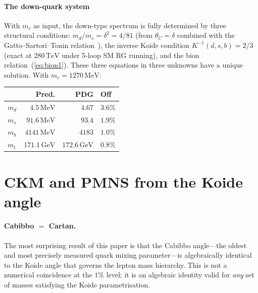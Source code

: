\documentclass[aps,prd,twocolumn,showpacs,preprintnumbers,superscriptaddress]{revtex4-2}
\newcommand{\MeV}{\,\mathrm{MeV}}
\newcommand{\GeV}{\,\mathrm{GeV}}
\newcommand{\TeV}{\,\mathrm{TeV}}
\begin{document}
\paragraph{The down-quark system}

With $m_c$ as input, the down-type spectrum is fully determined
by three structural conditions:
$m_d/m_s = \delta^2 = 4/81$ (from $\theta_C = \delta$ combined
with the Gatto--Sartori--Tonin relation~\cite{GattoSartoriTonin:1968}),
the inverse Koide condition $K^{-1}(d,s,b) = 2/3$ (exact at
$280\TeV$ under 5-loop SM RG running), and the bion
relation~(\ref{eq:bion1}).
These three equations in three unknowns have a unique solution.
With $m_c = 1270\MeV$:
\begin{center}
\begin{tabular}{lrrl}
\toprule
& Pred. & PDG & Off \\
\midrule
$m_d$ & $4.5\MeV$ & $4.67$ & $3.6\%$ \\
$m_s$ & $91.6\MeV$ & $93.4$ & $1.9\%$ \\
$m_b$ & $4141\MeV$ & $4183$ & $1.0\%$ \\
$m_t$ & $171.1\GeV$ & $172.6\GeV$ & $0.8\%$ \\
\bottomrule
\end{tabular}
\end{center}

\section{CKM and PMNS from the Koide angle}
\label{sec:mixing}

\paragraph{Cabibbo $=$ Cartan.}

The most surprising result of this paper is that the
Cabibbo angle---the oldest and most precisely measured
quark mixing parameter---is algebraically identical to the
Koide angle that governs the lepton mass hierarchy.
This is not a numerical coincidence at the $1\%$ level;
it is an algebraic identity valid for \emph{any} set of
masses satisfying the Koide parametrisation.
\end{document}

